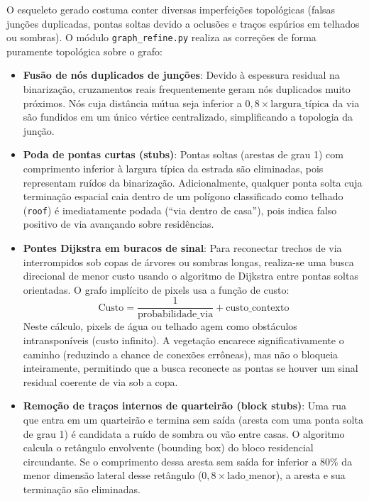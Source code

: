 \documentclass[12pt]{article}
\begin{document}
O esqueleto gerado costuma conter diversas imperfeições topológicas (falsas junções duplicadas, pontas soltas devido a oclusões e traços espúrios em telhados ou sombras). O módulo \texttt{graph\_refine.py} realiza as correções de forma puramente topológica sobre o grafo:
\begin{itemize}
    \item \textbf{Fusão de nós duplicados de junções}: Devido à espessura residual na binarização, cruzamentos reais frequentemente geram nós duplicados muito próximos. Nós cuja distância mútua seja inferior a $0{,}8 \times \text{largura\_típica}$ da via são fundidos em um único vértice centralizado, simplificando a topologia da junção.
    \item \textbf{Poda de pontas curtas (stubs)}: Pontas soltas (arestas de grau 1) com comprimento inferior à largura típica da estrada são eliminadas, pois representam ruídos da binarização. Adicionalmente, qualquer ponta solta cuja terminação espacial caia dentro de um polígono classificado como telhado (\texttt{roof}) é imediatamente podada (``via dentro de casa''), pois indica falso positivo de via avançando sobre residências.
    \item \textbf{Pontes Dijkstra em buracos de sinal}: Para reconectar trechos de via interrompidos sob copas de árvores ou sombras longas, realiza-se uma busca direcional de menor custo usando o algoritmo de Dijkstra entre pontas soltas orientadas. O grafo implícito de pixels usa a função de custo:
    \begin{equation}
    \text{Custo} = \frac{1}{\text{probabilidade\_via}} + \text{custo\_contexto}
    \end{equation}
    Neste cálculo, pixels de água ou telhado agem como obstáculos intransponíveis (custo infinito). A vegetação encarece significativamente o caminho (reduzindo a chance de conexões errôneas), mas não o bloqueia inteiramente, permitindo que a busca reconecte as pontas se houver um sinal residual coerente de via sob a copa.
    \item \textbf{Remoção de traços internos de quarteirão (block stubs)}: Uma rua que entra em um quarteirão e termina sem saída (aresta com uma ponta solta de grau 1) é candidata a ruído de sombra ou vão entre casas. O algoritmo calcula o retângulo envolvente (bounding box) do bloco residencial circundante. Se o comprimento dessa aresta sem saída for inferior a 80\% da menor dimensão lateral desse retângulo ($0{,}8 \times \text{lado\_menor}$), a aresta e sua terminação são eliminadas.
\end{itemize}
\end{document}
